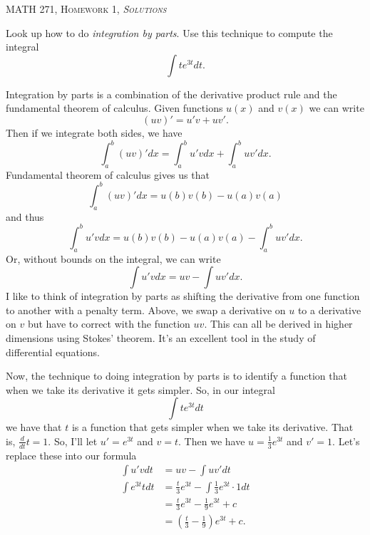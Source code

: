 \documentclass[12pt]{article} %
\begin{document}
\begin{center}
   \textsc{\large MATH 271, Homework 1, \emph{Solutions}}\\
\end{center}
\vspace{.5cm}

\begin{problem}
    Look up how to do \emph{integration by parts}. Use this technique to compute the integral
    \[
        \int t e^{3t}dt.
    \]
\end{problem}

\begin{solution}
    Integration by parts is a combination of the derivative product rule and the fundamental theorem of calculus.  Given functions $u(x)$ and $v(x)$ we can write
    \[
    (uv)'=u'v+uv'.
    \]
    Then if we integrate both sides, we have
    \[
    \int_a^b (uv)'dx = \int_a^b u'vdx + \int_a^b uv'dx.
    \]
    Fundamental theorem of calculus gives us that
    \[
    \int_a^b (uv)'dx = u(b)v(b)-u(a)v(a)
    \]
    and thus
    \[
    \int_a^b u'vdx = u(b)v(b)-u(a)v(a)-\int_a^b uv'dx.
    \]
    Or, without bounds on the integral, we can write
    \[
    \int u'vdx = uv - \int uv'dx.
    \]
    I like to think of integration by parts as shifting the derivative from one function to another with a penalty term.  Above, we swap a derivative on $u$ to a derivative on $v$ but have to correct with the function $uv$.  This can all be derived in higher dimensions using Stokes' theorem. It's an excellent tool in the study of differential equations.
    
    Now, the technique to doing integration by parts is to identify a function that when we take its derivative it gets simpler.  So, in our integral
    \[
    \int te^{3t}dt
    \]
    we have that $t$ is a function that gets simpler when we take its derivative. That is, $\frac{d}{dt}t=1$. So, I'll let $u'=e^{3t}$ and $v=t$.  Then we have $u=\frac{1}{3}e^{3t}$ and $v'=1$. Let's replace these into our formula
    \begin{align*}
        \int u'vdt &= uv - \int uv'dt\\
        \int e^{3t}tdt &= \frac{t}{3}e^{3t} - \int \frac{1}{3}e^{3t}\cdot 1 dt\\
        &= \frac{t}{3} e^{3t} - \frac{1}{9}e^{3t}+c\\
        &= \left( \frac{t}{3}-\frac{1}{9}\right)e^{3t}+c.
    \end{align*}
\end{solution}
\newpage
\end{document}
